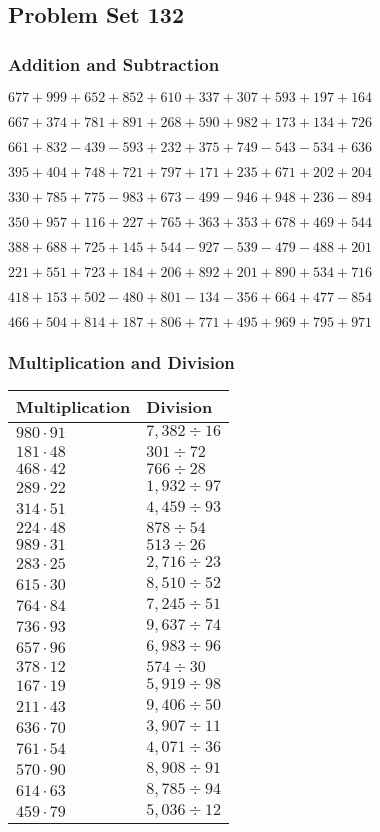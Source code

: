 \hypertarget{problem-set-132}{%
\subsection{Problem Set 132}\label{problem-set-132}}

\hypertarget{addition-and-subtraction}{%
\subsubsection{Addition and
Subtraction}\label{addition-and-subtraction}}

\(677 +999 +652 +852 +610 +337 +307 +593 +197 +164\)

\(667 +374 +781 +891 +268 +590 +982 +173 +134 +726\)

\(661 +832 - 439 - 593 +232 +375 +749 - 543 - 534 +636\)

\(395 +404 +748 +721 +797 +171 +235 +671 +202 +204\)

\(330 +785 +775 - 983 +673 - 499 - 946 +948 +236 - 894\)

\(350 +957 +116 +227 +765 +363 +353 +678 +469 +544\)

\(388 +688 +725 +145 +544 - 927 - 539 - 479 - 488 +201\)

\(221 +551 +723 +184 +206 +892 +201 +890 +534 +716\)

\(418 +153 +502 - 480 +801 - 134 - 356 +664 +477 - 854\)

\(466 +504 +814 +187 +806 +771 +495 +969 +795 +971\)

\hypertarget{multiplication-and-division}{%
\subsubsection{Multiplication and
Division}\label{multiplication-and-division}}

\begin{longtable}[]{@{}ll@{}}
\toprule
Multiplication & Division\tabularnewline
\midrule
\endhead
\(980 \cdot 91\) & \(7,382÷16\)\tabularnewline
\(181 \cdot 48\) & \(301÷72\)\tabularnewline
\(468 \cdot 42\) & \(766÷28\)\tabularnewline
\(289 \cdot 22\) & \(1,932÷97\)\tabularnewline
\(314 \cdot 51\) & \(4,459÷93\)\tabularnewline
\(224 \cdot 48\) & \(878÷54\)\tabularnewline
\(989 \cdot 31\) & \(513÷26\)\tabularnewline
\(283 \cdot 25\) & \(2,716÷23\)\tabularnewline
\(615 \cdot 30\) & \(8,510÷52\)\tabularnewline
\(764 \cdot 84\) & \(7,245÷51\)\tabularnewline
\(736 \cdot 93\) & \(9,637÷74\)\tabularnewline
\(657 \cdot 96\) & \(6,983÷96\)\tabularnewline
\(378 \cdot 12\) & \(574 ÷30\)\tabularnewline
\(167 \cdot 19\) & \(5,919÷98\)\tabularnewline
\(211 \cdot 43\) & \(9,406÷50\)\tabularnewline
\(636 \cdot 70\) & \(3,907÷11\)\tabularnewline
\(761 \cdot 54\) & \(4,071÷36\)\tabularnewline
\(570 \cdot 90\) & \(8,908÷91\)\tabularnewline
\(614 \cdot 63\) & \(8,785÷94\)\tabularnewline
\(459 \cdot 79\) & \(5,036÷12\)\tabularnewline
\bottomrule
\end{longtable}
